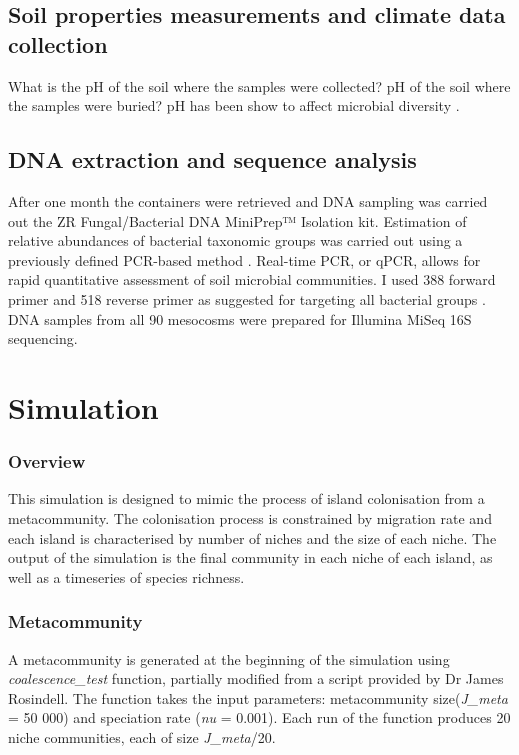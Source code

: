 \subsection{Soil properties measurements and climate data collection}
\noindent What is the pH of the soil where the samples were collected? pH of the soil where the samples were buried? pH has been show to affect microbial diversity \cite{GriffithsRobertI.2011Tbbo}.

\subsection{DNA extraction and sequence analysis}
\noindent After one month the containers were retrieved and DNA sampling was carried out the ZR Fungal/Bacterial DNA MiniPrep™ Isolation kit. Estimation of relative abundances of bacterial taxonomic groups was carried out using a previously defined PCR-based method \cite{FiererNoah2005Aosm}. Real-time PCR, or qPCR, allows for rapid quantitative assessment of soil microbial communities. I used 388 forward primer and 518 reverse primer as suggested for targeting all bacterial groups \cite{FiererNoah2005Aosm}. DNA samples from all 90 mesocosms were prepared for Illumina MiSeq 16S sequencing.

\section{Simulation}

\subsubsection{Overview}
This simulation is designed to mimic the process of island colonisation from a metacommunity. The colonisation process is constrained by migration rate and each island is characterised by number of niches and the size of each niche. The output of the simulation is the final community in each niche of each island, as well as a timeseries of species richness. 

\subsubsection{Metacommunity}
A metacommunity is generated at the beginning of the simulation using \textit{coalescence\_test} function, partially modified from a script provided by Dr James Rosindell. The function takes the input parameters: metacommunity size(\textit{J\_meta} = 50 000) and speciation rate (\textit{nu} = 0.001). Each run of the function produces 20 niche communities, each of size \textit{J\_meta}/20.  \bigskip

